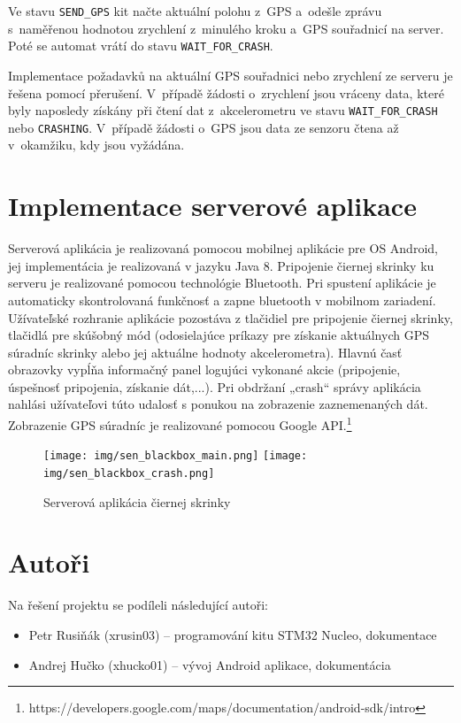 \documentclass[a4paper,11pt,titlepage]{article}
\begin{document}
Ve stavu \texttt{SEND\_GPS} kit načte aktuální polohu z~GPS a~odešle zprávu s~naměřenou hodnotou
zrychlení z~minulého kroku a~GPS souřadnicí na server. Poté se automat vrátí do stavu
\texttt{WAIT\_FOR\_CRASH}.

Implementace požadavků na aktuální GPS souřadnici nebo zrychlení ze serveru
je řešena pomocí přerušení. V~případě žádosti o~zrychlení jsou vráceny data,
které byly naposledy získány při čtení dat z~akcelerometru ve stavu \texttt{WAIT\_FOR\_CRASH}
nebo \texttt{CRASHING}. V~případě žádosti o~GPS jsou data ze senzoru čtena až v~okamžiku,
kdy jsou vyžádána.

\section{Implementace serverové aplikace}
Serverová aplikácia je realizovaná pomocou mobilnej aplikácie pre OS Android, jej implementácia je realizovaná v jazyku Java 8. Pripojenie čiernej skrinky ku serveru je realizované pomocou technológie Bluetooth. Pri spustení aplikácie je automaticky skontrolovaná funkčnosť a zapne bluetooth v mobilnom zariadení. Užívateľské rozhranie aplikácie pozostáva z tlačidiel pre pripojenie čiernej skrinky, tlačidlá pre skúšobný mód (odosielajúce príkazy pre získanie aktuálnych GPS súradníc skrinky alebo jej aktuálne hodnoty akcelerometra). Hlavnú časť obrazovky vypĺňa informačný panel logujúci vykonané akcie (pripojenie, úspešnosť pripojenia, získanie dát,...). Pri obdržaní „crash“ správy aplikácia nahlási užívateľovi túto udalosť s ponukou na zobrazenie zaznemenaných dát. Zobrazenie GPS súradníc je realizované pomocou Google API.\footnote{https://developers.google.com/maps/documentation/android-sdk/intro} 

\begin{figure}[ht]
\begin{center}
\texttt{[image: img/sen\_blackbox\_main.png]}
\hspace{1em}
\texttt{[image: img/sen\_blackbox\_crash.png]}
\caption{Serverová aplikácia čiernej skrinky}
\end{center}
\end{figure}

\newpage
\section{Autoři}

Na řešení projektu se podíleli následující autoři:

\begin{itemize}
\item Petr Rusiňák (xrusin03) -- programování kitu STM32 Nucleo, dokumentace
\item Andrej Hučko (xhucko01) -- vývoj Android aplikace, dokumentácia
\end{itemize}
\end{document}
